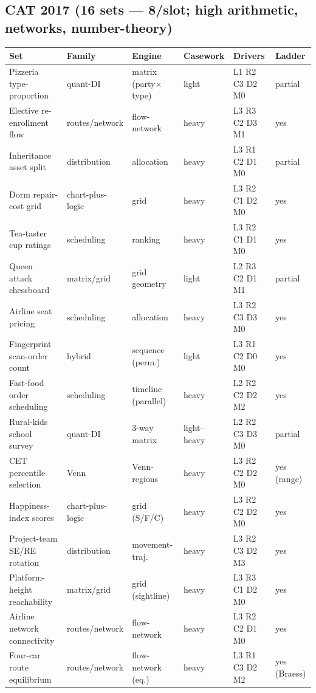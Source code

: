 \documentclass[11pt,a4paper]{article}
\newcommand{\invtab}{\footnotesize}
\begin{document}
\subsection{CAT 2017 (16 sets --- 8/slot; high arithmetic, networks, number-theory)}
{\invtab
\begin{longtable}{p{3.0cm}p{2.05cm}p{2.5cm}p{1.2cm}p{2.05cm}p{1.7cm}}
\toprule
\textbf{Set} & \textbf{Family} & \textbf{Engine} & \textbf{Casework} & \textbf{Drivers} & \textbf{Ladder} \\
\midrule
\endhead
Pizzeria type-proportion & quant-DI & matrix (party$\times$type) & light & L1 R2 C3 D2 M0 & partial \\
Elective re-enrollment flow & routes/network & flow-network & heavy & L3 R3 C2 D3 M1 & yes \\
Inheritance asset split & distribution & allocation & heavy & L3 R1 C2 D1 M0 & partial \\
Dorm repair-cost grid & chart-plus-logic & grid & heavy & L3 R2 C1 D2 M0 & yes \\
Tea-taster cup ratings & scheduling & ranking & heavy & L3 R2 C1 D1 M0 & yes \\
Queen attack chessboard & matrix/grid & grid geometry & light & L2 R3 C2 D1 M1 & partial \\
Airline seat pricing & scheduling & allocation & heavy & L3 R2 C3 D3 M0 & yes \\
Fingerprint scan-order count & hybrid & sequence (perm.) & light & L3 R1 C2 D0 M0 & yes \\
Fast-food order scheduling & scheduling & timeline (parallel) & heavy & L2 R2 C2 D2 M2 & yes \\
Rural-kids school survey & quant-DI & 3-way matrix & light--heavy & L2 R2 C3 D3 M0 & partial \\
CET percentile selection & Venn & Venn-regions & heavy & L3 R2 C2 D2 M0 & yes (range) \\
Happiness-index scores & chart-plus-logic & grid (S/F/C) & heavy & L3 R2 C2 D2 M0 & yes \\
Project-team SE/RE rotation & distribution & movement-traj. & heavy & L3 R2 C3 D2 M3 & yes \\
Platform-height reachability & matrix/grid & grid (sightline) & heavy & L3 R3 C1 D2 M0 & yes \\
Airline network connectivity & routes/network & flow-network & heavy & L3 R2 C2 D1 M0 & yes \\
Four-car route equilibrium & routes/network & flow-network (eq.) & heavy & L3 R1 C3 D2 M2 & yes (Braess) \\
\bottomrule
\end{longtable}}
\end{document}
